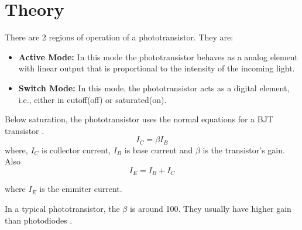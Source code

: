 \section{Theory}
There are 2 regions of operation of a phototransistor. They are:
\begin{itemize}
    \item \textbf{Active Mode:} In this mode the phototransistor behaves as a analog element with linear output that is proportional to the
          intensity of the incoming light.
    \item \textbf{Switch Mode:} In this mode, the phototransistor acts as a digital element, i.e., either in cutoff(off) or saturated(on).
\end{itemize}

\noindent Below saturation, the phototransistor uses the normal equations for a BJT transistor \cite{embed}.
\begin{equation}
    I_C = \beta I_B
\end{equation}
\noindent where, $I_C$ is collector current, $I_B$ is base current and $\beta$ is the transistor's gain. \\ Also
\begin{equation}
    I_E = I_B + I_C
\end{equation}

\noindent where $I_E$ is the emmiter current.

In a typical phototransistor, the $\beta$ is around 100. They usually have higher gain than photodiodes \cite{embed}.